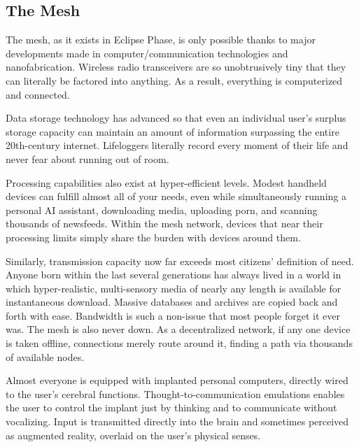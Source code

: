\subsection{The Mesh}

The mesh, as it exists in Eclipse Phase, is only possible thanks to major
developments made in computer/communication technologies and nanofabrication.
Wireless radio transceivers are so unobtrusively tiny that they can literally
be factored into anything. As a result, everything is computerized and
connected.

Data storage technology has advanced so that even an individual user's surplus
storage capacity can maintain an amount of information surpassing the entire
20th-century internet. Lifeloggers literally record every moment of their life
and never fear about running out of room.

Processing capabilities also exist at hyper-efficient levels. Modest handheld
devices can fulfill almost all of your needs, even while simultaneously running
a personal AI assistant, downloading media, uploading porn, and scanning
thousands of newsfeeds. Within the mesh network, devices that near their
processing limits simply share the burden with devices around them.

Similarly, transmission capacity now far exceeds most citizens' definition
of need. Anyone born within the last several generations has always lived in a
world in which hyper-realistic, multi-sensory media of nearly any length is
available for instantaneous download. Massive databases and archives are
copied back and forth with ease. Bandwidth is such a non-issue that most
people forget it ever was. The mesh is also never down. As a decentralized
network, if any one device is taken offline, connections merely route around
it, finding a path via thousands of available nodes.

Almost everyone is equipped with implanted personal computers, directly wired
to the user's cerebral functions. Thought-to-communication emulations enables
the user to control the implant just by thinking and to communicate without
vocalizing. Input is transmitted directly into the brain and sometimes
perceived as augmented reality, overlaid on the user's physical senses.

